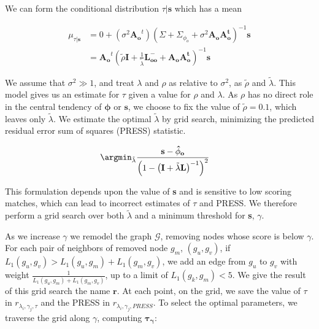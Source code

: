     We can form the conditional distribution $\tau|\mathbf{s}$ which has a mean

    \begin{align}
        \mu_{\tau|\mathbf{s}} &= 0 + (\sigma^2\mathbf{A_o}^t)\left(
            \Sigma + \Sigma_{\phi_o} + \sigma^2\mathbf{A_oA_o^t}\right)^{-1}\mathbf{s}\\
        &= \mathbf{A_o}^t\left(
            {\tilde\rho}\mathbf{I} + \frac{1}{{\tilde\lambda}}\mathbf{L_{oo}^-} + 
            \mathbf{A_oA_o^t}
            \right)^{-1}\mathbf{s} \label{eqn:tau_given_s}
    \end{align}

        We assume that $\sigma^2 \gg 1$, and treat $\lambda$ and $\rho$
    as relative to $\sigma^2$, as ${\tilde \rho}$ and ${\tilde \lambda}$.
    This model gives us an estimate for $\tau$ given a value for
    $\rho$ and $\lambda$. As $\rho$ has no direct role in the central
    tendency of $\mathbf{\phi}$ or $\mathbf{s}$, we choose to fix the
    value of ${\tilde \rho} = 0.1$, which leaves only ${\tilde \lambda}$.
    We estimate the optimal ${\tilde \lambda}$ by grid search, minimizing
    the predicted residual error sum of squares (PRESS) statistic.

    \begin{align}
        \argmin_{\tilde \lambda} & \frac{\mathbf{s - {\hat \phi_o}}}{\left(
            1 - \left(
                \mathbf{I} + {\tilde \lambda}\mathbf{L}
            \right)^{-1}
        \right)^2}
    \end{align}

        This formulation depends upon the value of \textbf{s} and is
    sensitive to low scoring matches, which can lead to incorrect
    estimates of $\tau$ and PRESS. We therefore perform a grid
    search over both ${\tilde \lambda}$ and a minimum threshold
    for \textbf{s}, $\gamma$.

        As we increase $\gamma$ we remodel the graph $\mathcal{G}$,
    removing nodes whose score is below $\gamma$. For each pair
    of neighbors of removed node $g_m$, $(g_u, g_v)$, if
    $L_1(g_u, g_v) >  L_1(g_u, g_m) + L_1(g_m, g_v)$, we add an
    edge from $g_u$ to $g_v$ with weight $\frac{1}{L_1(g_u, g_m)
    + L_1(g_m, g_v)}$, up to a limit of $L_1(g_k, g_m) < 5$.
    We give the result of this grid search the name $\mathbf{r}$.
    At each point, on the grid, we save the value of $\tau$ in
    $r_{\lambda_i, \gamma_j, \tau}$ and the PRESS in $r_{
    \lambda_i, \gamma_j, PRESS}$. To select the optimal parameters,
    we traverse the grid along $\gamma$, computing $\mathbf{\tau_\gamma}$:

